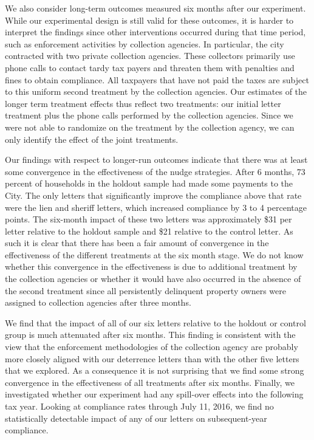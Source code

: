 \documentclass[12pt]{article}
\begin{document}
We also consider long-term outcomes measured six months after our
experiment. While our experimental design is still valid for these
outcomes, it is harder to interpret the findings since other
interventions occurred during that time period, such as enforcement
activities by collection agencies. In particular, the city contracted
with two private collection agencies. These collectors primarily use
phone calls to contact tardy tax payers and threaten them with
penalties and fines to obtain compliance. All taxpayers that have not
paid the taxes are subject to this uniform second treatment by the
collection agencies.  Our estimates of the longer term treatment effects
thus reflect two treatments: our initial letter treatment plus the
phone calls performed by the collection agencies. Since we were not able
to randomize on the treatment by the collection agency, we can only
identify the effect of the joint treatments.

Our findings with respect to longer-run outcomes indicate that there
was at least some convergence in the effectiveness of the nudge
strategies. After 6 months, 73 percent of households in the holdout
sample had made some payments to the City. The only letters that
significantly improve the compliance above that rate were the lien and
sheriff letters, which increased compliance by 3 to 4 percentage
points. The six-month impact of these two letters was approximately
\$31 per letter relative to the holdout sample and \$21 relative to
the control letter. As such it is clear that there has been a fair
amount of convergence in the effectiveness of the different treatments
at the six month stage. We do not know whether this convergence in the
effectiveness is due to additional treatment by the collection agencies
or whether it would have also occurred in the absence of the second
treatment since all persistently delinquent property owners were assigned
to collection agencies after three months.

We find that the impact of all of our six letters relative to the
holdout or control group is much attenuated after six months. This
finding is consistent with the view that the enforcement methodologies
of the collection agency are probably more closely aligned with our
deterrence letters than with the other five letters that we
explored. As a consequence it is not surprising that we find some
strong convergence in the effectiveness of all treatments after six
months. Finally, we investigated whether our experiment had any
spill-over effects into the following tax year. Looking at compliance
rates through July 11, 2016, we find no statistically detectable
impact of any of our letters on subsequent-year compliance.
\end{document}
